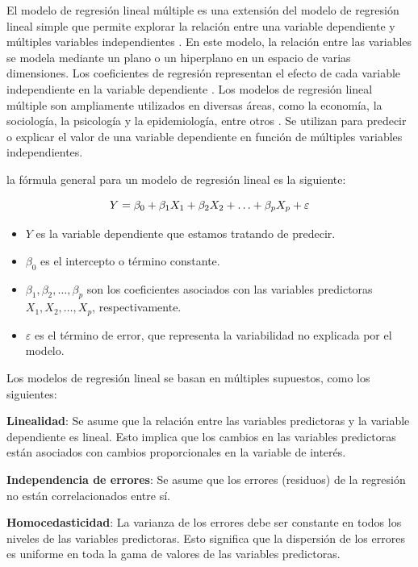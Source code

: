 \documentclass[
  11pt,
  bookmarksnumbered]{article}
\providecommand{\tightlist}{%
  \setlength{\itemsep}{0pt}\setlength{\parskip}{0pt}}
\begin{document}
El modelo de regresión lineal múltiple es una extensión del modelo de regresión lineal simple que permite explorar la relación entre una variable dependiente y múltiples variables independientes \textcite{montgomery2012introduction}.
En este modelo, la relación entre las variables se modela mediante un plano o un hiperplano en un espacio de varias dimensiones.
Los coeficientes de regresión representan el efecto de cada variable independiente en la variable dependiente \textcite{fox2015applied}.
Los modelos de regresión lineal múltiple son ampliamente utilizados en diversas áreas, como la economía, la sociología, la psicología y la epidemiología, entre otros \textcite{draper2014applied}.
Se utilizan para predecir o explicar el valor de una variable dependiente en función de múltiples variables independientes.

la fórmula general para un modelo de regresión lineal es la siguiente: 

\begin{equation}
\large Y = \beta_0 + \beta_1 X_1 + \beta_2 X_2 + \ldots + \beta_p X_p + \varepsilon\end{equation}

\begin{itemize}
\tightlist
\item
  \(Y\) es la variable dependiente que estamos tratando de predecir.
\item
  \(\beta_0\) es el intercepto o término constante.
\item
  \(\beta_1, \beta_2, \ldots, \beta_p\) son los coeficientes asociados con las variables predictoras \(X_1, X_2, \ldots, X_p\), respectivamente.
\item
  \(\varepsilon\) es el término de error, que representa la variabilidad no explicada por el modelo.
\end{itemize}

Los modelos de regresión lineal se basan en múltiples supuestos, como los siguientes:

\textbf{Linealidad}: Se asume que la relación entre las variables predictoras y la variable dependiente es lineal.
Esto implica que los cambios en las variables predictoras están asociados con cambios proporcionales en la variable de interés.

\textbf{Independencia de errores}: Se asume que los errores (residuos) de la regresión no están correlacionados entre sí.

\textbf{Homocedasticidad}: La varianza de los errores debe ser constante en todos los niveles de las variables predictoras.
Esto significa que la dispersión de los errores es uniforme en toda la gama de valores de las variables predictoras.
\end{document}
